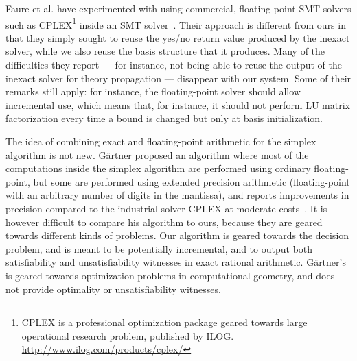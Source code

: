 Faure et al. have experimented with using commercial, floating-point SMT solvers such as CPLEX\footnote{CPLEX is a professional optimization package geared towards large operational research problem, published by ILOG. \url{http://www.ilog.com/products/cplex/}}
inside an SMT solver~\cite{Faure_et_al_SAT08}. Their approach is different from ours in that they simply sought to reuse the yes/no return value produced by the inexact solver, while we also reuse the basis structure that it produces. Many of the difficulties they report --- for instance, not being able to reuse the output of the inexact solver for theory propagation --- disappear with our system. Some of their remarks still apply: for instance, the floating-point solver should allow incremental use, which means that, for instance, it should not perform LU matrix factorization every time a bound is changed but only at basis initialization.

The idea of combining exact and floating-point arithmetic for the simplex algorithm is not new. G\"artner proposed an algorithm where most of the computations inside the simplex algorithm are performed using ordinary floating-point, but some are performed using extended precision arithmetic (floating-point with an arbitrary number of digits in the mantissa), and reports improvements in precision compared to the industrial solver CPLEX at moderate costs~\cite{Gaertner_SODA98}. It is however difficult to compare his algorithm to ours, because they are geared towards different kinds of problems. Our algorithm is geared towards the decision problem, and is meant to be potentially incremental, and to output both satisfiability and unsatisfiability witnesses in exact rational arithmetic. G\"artner's is geared towards optimization problems in computational geometry, and does not provide optimality or unsatisfiability witnesses.

